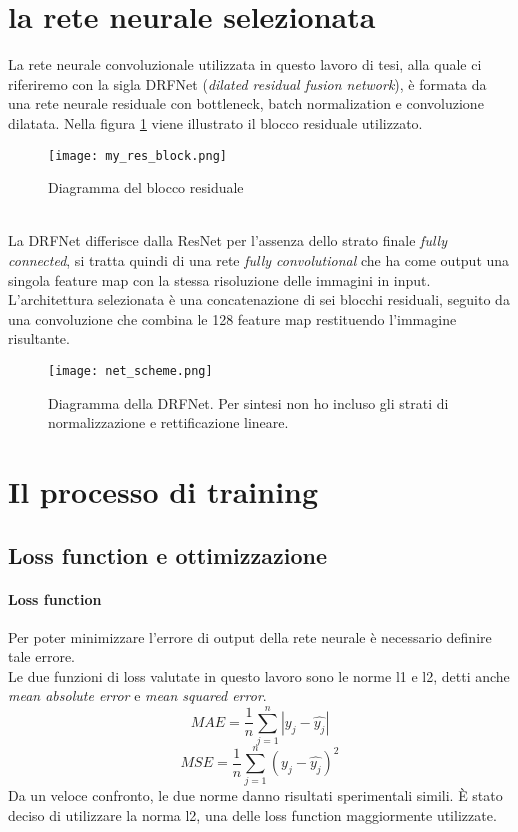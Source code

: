 \section{la rete neurale selezionata}
La rete neurale convoluzionale utilizzata in questo lavoro di tesi, alla quale ci riferiremo con la sigla DRFNet (\textit{dilated residual fusion network}), è formata da una rete neurale residuale con bottleneck, batch normalization e convoluzione dilatata. Nella figura \ref{my_res_block} viene illustrato il blocco residuale utilizzato.
\begin{figure}[ht]
    \centering
    \texttt{[image: my\_res\_block.png]}
    \caption[Diagramma del blocco residuale]{Diagramma del blocco residuale}
    \label{my_res_block}
\end{figure}\\
La DRFNet differisce dalla ResNet per l'assenza dello strato finale \textit{fully connected}, si tratta quindi di una rete \textit{fully convolutional} che ha come output una singola feature map con la stessa risoluzione delle immagini in input. L'architettura selezionata è una concatenazione di sei blocchi residuali, seguito da una convoluzione che combina le 128 feature map restituendo l'immagine risultante.
\begin{figure}[ht]
    \centering
    \texttt{[image: net\_scheme.png]}
    \caption[Architettura della CNN]{Diagramma della DRFNet. Per sintesi non ho incluso gli strati di normalizzazione e rettificazione lineare.}
    \label{my_net}
\end{figure}

\section{Il processo di training}
\subsection{Loss function e ottimizzazione}
\paragraph{Loss function} Per poter minimizzare l'errore di output della rete neurale è necessario definire tale errore.\\
Le due funzioni di loss valutate in questo lavoro sono le norme l1 e l2, detti anche \textit{mean absolute error} e \textit{mean squared error}.
$$MAE=\frac{1}{n} \sum_{j=1}^{n} |y_j-\hat{y_j}|$$
$$MSE=\frac{1}{n} \sum_{j=1}^{n} (y_j-\hat{y_j})^2$$
Da un veloce confronto, le due norme danno risultati sperimentali simili. È stato deciso di utilizzare la norma l2, una delle loss function maggiormente utilizzate.

